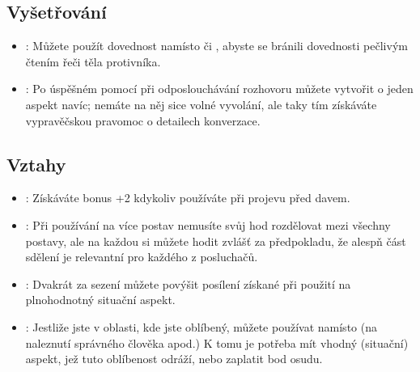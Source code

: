 \subsection{Vyšetřování}
\label{sec:trik-vysetrovani}
\begin{itemize}

\item{}:
\label{sec:vysetrovani-mikro}
Můžete použít dovednost  namísto  či , abyste se bránili dovednosti  pečlivým čtením řeči těla protivníka.

\item{}
\label{sec:vysetrovani-fizlovani}:
Po úspěšném  pomocí  při odposlouchávání rozhovoru můžete vytvořit o jeden aspekt navíc; nemáte na něj sice volné vyvolání, ale taky tím získáváte vypravěčskou pravomoc o detailech konverzace.
\end{itemize}


\subsection{Vztahy}
\label{sec:trik-vztahy}
\begin{itemize}

\item{}:
  \label{sec:vztahy-demgagog}
  Získáváte bonus +2 kdykoliv používáte  při projevu před davem.

\item{}:
  \label{sec:vztahy-individual}
  Při používání  na více postav nemusíte svůj hod rozdělovat mezi všechny postavy, ale na každou si můžete hodit zvlášť za předpokladu, že alespň část sdělení je relevantní pro každého z posluchačů.

\item{}:
  \label{sec:vztahy-piti}
  Dvakrát za sezení můžete povýšit posílení získané při použití  na plnohodnotný situační aspekt.

\item{}:
  \label{sec:vztahy-popularni}
  Jestliže jste v oblasti, kde jste oblíbený, můžete používat  namísto  (na naleznutí správného člověka apod.) K tomu je potřeba mít vhodný (situační) aspekt, jež tuto oblíbenost odráží, nebo zaplatit bod osudu.
  
\end{itemize}

